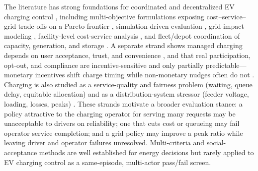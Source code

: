 \documentclass[12pt]{article}
\begin{document}
The literature has strong foundations for coordinated and decentralized EV charging control \cite{ma2013,gan2013,sortomme2011,rotering2011,richardson2012local,lee2021adaptive,nimalsiri2020,sadeghian2022,liu2019decentralized,pournaras2019}, including multi-objective formulations exposing cost--service--grid trade-offs on a Pareto frontier \cite{wang2024multiobj,das2020technoecon}, simulation-driven evaluation \cite{lee2019acnsim,quiros2018}, grid-impact modeling \cite{lopes2011,richardson2013,shaukat2018}, facility-level cost-service analysis \cite{woo2021}, and fleet/depot coordination of capacity, generation, and storage \cite{liu2024busdepot,passow2025fleet}. A separate strand shows managed charging depends on user acceptance, trust, and convenience \cite{will2016,bailey2015,schmalfuss2015,delmonte2020,tarroja2021,sovacool2018,hardman2018,funke2019}, and that real participation, opt-out, and compliance are incentive-sensitive and only partially predictable---monetary incentives shift charge timing while non-monetary nudges often do not \cite{alexeenko2023pilot,dudek2021electricnation,bailey2025fieldexp,wong2023incentives,marxen2023flexibility}. Charging is also studied as a service-quality and fairness problem (waiting, queue delay, equitable allocation) \cite{woo2021,danner2021,tan2023fair,tsaousoglou2023fair,theodoropoulos2022proportional} and as a distribution-system stressor (feeder voltage, loading, losses, peaks) \cite{clement2010,elnozahy2014,green2011,muratori2018,dubey2015,pieltain2011,powell2022}. These strands motivate a broader evaluation stance: a policy attractive to the charging operator for serving many requests may be unacceptable to drivers on reliability; one that cuts cost or queueing may fail operator service completion; and a grid policy may improve a peak ratio while leaving driver and operator failures unresolved. Multi-criteria and social-acceptance methods are well established for energy decisions \cite{wang2009mcda,wustenhagen2007acceptance} but rarely applied to EV charging control as a same-episode, multi-actor pass/fail screen.
\end{document}
